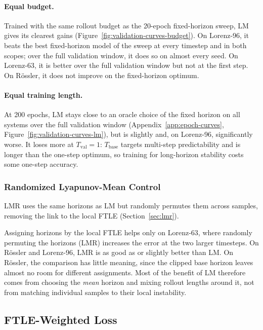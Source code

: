 \documentclass{article}
\begin{document}
\paragraph{Equal budget.}
Trained with the same rollout budget as the 20-epoch fixed-horizon sweep, LM gives its clearest gains (Figure~\ref{fig:validation-curves-budget}). On Lorenz-96, it beats the best fixed-horizon model of the sweep at every timestep and in both scopes; over the full validation window, it does so on almost every seed. On Lorenz-63, it is better over the full validation window but not at the first step. On Rössler, it does not improve on the fixed-horizon optimum.

\paragraph{Equal training length.}
At 200 epochs, LM stays close to an oracle choice of the fixed horizon on all systems over the full validation window (Appendix~\ref{app:epoch-curves}, Figure~\ref{fig:validation-curves-lm}), but is slightly and, on Lorenz-96, significantly worse. It loses more at $T_{\mathrm{val}} = 1$: $T_{\mathrm{base}}$ targets multi-step predictability and is longer than the one-step optimum, so training for long-horizon stability costs some one-step accuracy.

\subsubsection{Randomized Lyapunov-Mean Control}
\label{sec:results-lmr}

LMR uses the same horizons as LM but randomly permutes them across samples, removing the link to the local FTLE (Section~\ref{sec:lmr}).

Assigning horizons by the local FTLE helps only on Lorenz-63, where randomly permuting the horizons (LMR) increases the error at the two larger timesteps. On Rössler and Lorenz-96, LMR is as good as or slightly better than LM. On Rössler, the comparison has little meaning, since the clipped base horizon leaves almost no room for different assignments. Most of the benefit of LM therefore comes from choosing the \emph{mean} horizon and mixing rollout lengths around it, not from matching individual samples to their local instability.

\subsection{FTLE-Weighted Loss}
\label{sec:results-wl}
\end{document}
